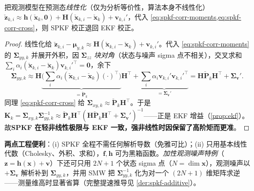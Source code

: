 \begin{proposition}\label{prop:spkf-ekf}
把观测模型在预测态\emph{线性化}（仅为分析等价性，算法本身不线性化）$\check{\mathbf{z}}_{k,i}\approx\mathbf{h}(\check{\mathbf{x}}_k,\mathbf{0})+\mathbf{H}(\check{\mathbf{x}}_{k,i}-\check{\mathbf{x}}_k)+\mathbf{v}_{k,i}'$，代入 \cref{eq:spkf-corr-moments,eq:spkf-corr-cross}，则 SPKF 校正退回 EKF 校正。
\end{proposition}
\begin{proof}
线性化给 $\check{\mathbf{z}}_{k,i}-\boldsymbol{\mu}_{y,k}\approx\mathbf{H}(\check{\mathbf{x}}_{k,i}-\check{\mathbf{x}}_k)+\mathbf{v}_{k,i}'$。代入 \cref{eq:spkf-corr-moments} 的 $\boldsymbol{\Sigma}_{yy,k}$ 并展开外积，因 $\boldsymbol{\Sigma}_{zz}$ \emph{块对角}（状态与噪声 sigma 点不相关），交叉求和 $\sum_i\alpha_i(\check{\mathbf{x}}_{k,i}-\check{\mathbf{x}}_k)\mathbf{v}_{k,i}'^\top=\mathbf{0}$，余下
\[
  \boldsymbol{\Sigma}_{yy,k}\approx\mathbf{H}\underbrace{\Big(\sum_i\alpha_i(\check{\mathbf{x}}_{k,i}-\check{\mathbf{x}}_k)(\cdot)^\top\Big)}_{=\check{\mathbf{P}}_k}\mathbf{H}^\top+\underbrace{\sum_i\alpha_i\mathbf{v}_{k,i}'\mathbf{v}_{k,i}'^\top}_{=\boldsymbol{\Sigma}_{\mathbf{v}}'}=\mathbf{H}\check{\mathbf{P}}_k\mathbf{H}^\top+\boldsymbol{\Sigma}_{\mathbf{v}}'.
\]
同理 \cref{eq:spkf-corr-cross} 给 $\boldsymbol{\Sigma}_{xy,k}\approx\check{\mathbf{P}}_k\mathbf{H}^\top$。于是 $\mathbf{K}_k=\boldsymbol{\Sigma}_{xy,k}\boldsymbol{\Sigma}_{yy,k}^{-1}\approx\check{\mathbf{P}}_k\mathbf{H}^\top(\mathbf{H}\check{\mathbf{P}}_k\mathbf{H}^\top+\boldsymbol{\Sigma}_{\mathbf{v}}')^{-1}$——正是 EKF 增益（\cref{prop:ekf}）。故\textbf{SPKF 在轻非线性极限与 EKF 一致，强非线性时因保留了高阶矩而更准}\cite{barfoot2024state}。
\end{proof}

\noindent\textbf{两点工程便利}\cite{barfoot2024state}：(i) SPKF 全程不需任何解析导数（免雅可比）；(ii) 只用基本线性代数（Cholesky、外积、求和），$\mathbf{f},\mathbf{h}$ 可为黑箱函数。\emph{加性观测噪声特例}（$\mathbf{z}=\mathbf{h}(\mathbf{x})+\mathbf{v}$）下还可只用 $2N+1$ 个状态 sigma 点（$N=\dim\mathbf{x}$），观测噪声以 $+\boldsymbol{\Sigma}_{\mathbf{v}}$ 解析补到 $\boldsymbol{\Sigma}_{yy,k}$，并用 SMW 把 $\boldsymbol{\Sigma}_{yy,k}^{-1}$ 化为对一个 $(2N+1)$ 维矩阵求逆——测量维高时显著省算\cite{barfoot2024state}（完整提速推导见 \cref{der:spkf-additive}）。

